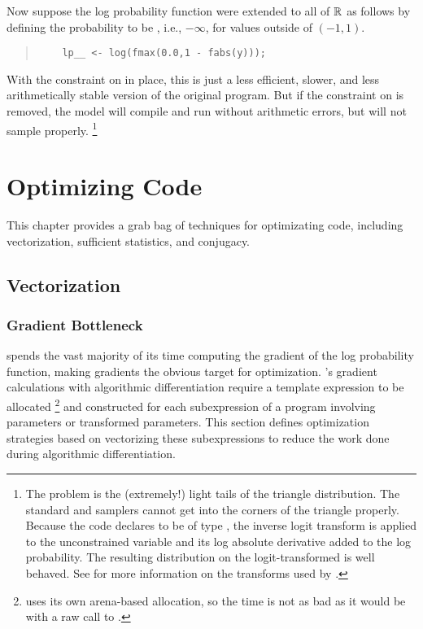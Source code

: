 Now suppose the log probability function were extended to all of
$\mathbb{R}$ as follows by defining the probability to be ,
i.e., $-\infty$, for values outside of $(-1,1)$.
%
\begin{quote}
\begin{Verbatim}
    lp__ <- log(fmax(0.0,1 - fabs(y)));
\end{Verbatim}
\end{quote}
%
With the constraint on  in place, this is just a less
efficient, slower, and less arithmetically stable version of the
original program.  But if the constraint on  is removed, 
the model will compile and run without arithmetic errors, but will not
sample properly.%
%
\footnote{The problem is the (extremely!) light tails of the triangle
  distribution.  The standard \HMC and \NUTS samplers cannot get into the
  corners of the triangle properly.  Because the \Stan code declares
   to be of type , the inverse logit
  transform is applied to the unconstrained variable and its log
  absolute derivative added to the log probability.  The resulting
  distribution on the logit-transformed  is well behaved.  See
   for more information on the
  transforms used by \Stan.}



\chapter{Optimizing \Stan Code}\label{optimization.chapter}
\noindent
This chapter provides a grab bag of techniques for optimizating \Stan
code, including vectorization, sufficient statistics, and conjugacy.

\section{Vectorization}

\subsection{Gradient Bottleneck}

\Stan spends the vast majority of its time computing the gradient of
the log probability function, making gradients the obvious target for
optimization.  \Stan's gradient calculations with algorithmic
differentiation require a template expression to be allocated%
%
\footnote{\Stan uses its own arena-based allocation, so the time is
not as bad as it would be with a raw call to .}
%
and constructed for each subexpression of a \Stan program involving
parameters or transformed parameters.  This section defines
optimization strategies based on vectorizing these subexpressions to
reduce the work done during algorithmic differentiation.

